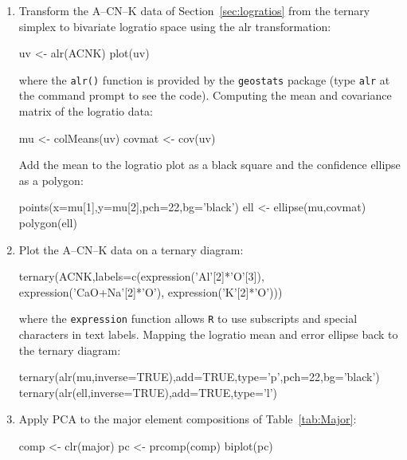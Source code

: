 \begin{enumerate}

\item Transform the A--CN--K data of Section~\ref{sec:logratios} from
  the ternary simplex to bivariate logratio space using the alr
  transformation:

\begin{script}
uv <- alr(ACNK)
plot(uv)
\end{script}

\noindent where the \texttt{alr()} function is provided by the
\texttt{geostats} package (type \texttt{alr} at the command prompt to
see the code). Computing the mean and covariance matrix of the
logratio data:

\begin{script}[firstnumber=3]
mu <- colMeans(uv)
covmat <- cov(uv)
\end{script}

Add the mean to the logratio plot as a black square and the confidence
ellipse as a polygon:

\begin{script}[firstnumber=5]
points(x=mu[1],y=mu[2],pch=22,bg='black')
ell <- ellipse(mu,covmat)
polygon(ell)
\end{script}

\item Plot the A--CN--K data on a ternary diagram:

\begin{script}
ternary(ACNK,labels=c(expression('Al'[2]*'O'[3]),
                      expression('CaO+Na'[2]*'O'),
                      expression('K'[2]*'O')))
\end{script}

\noindent where the \texttt{expression} function allows \texttt{R} to
use subscripts and special characters in text labels. Mapping the
logratio mean and error ellipse back to the ternary diagram:

\begin{script}[firstnumber=4]
ternary(alr(mu,inverse=TRUE),add=TRUE,type='p',pch=22,bg='black')
ternary(alr(ell,inverse=TRUE),add=TRUE,type='l')
\end{script}

\item Apply PCA to the major element compositions of
  Table~\ref{tab:Major}:

\begin{script}
comp <- clr(major)
pc <- prcomp(comp)
biplot(pc)
\end{script}


\end{enumerate}
